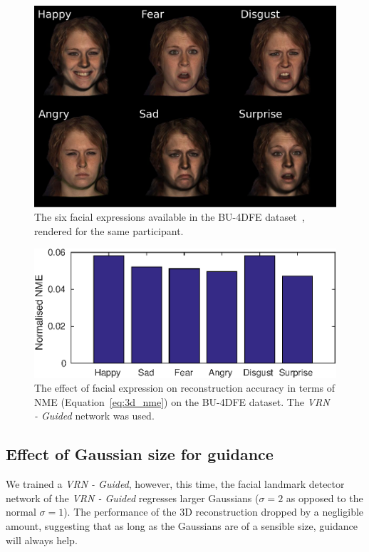 \begin{figure}
  \centering
  \includegraphics[width=0.8\linewidth]{img/bu4dfe_expressions.pdf}
  \caption[The six facial expressions available in the BU-4DFE
  dataset]{The six facial expressions available in the BU-4DFE
    dataset~\cite{yin2008high}, rendered for the same participant.}
  \label{fig:bu4dfe_expressions}
\end{figure}

\begin{figure}
  \centering
  \includegraphics[width=0.7\linewidth]{curves/ablation_expression.eps}
  \caption[Effect of facial expressions]{The effect of facial
    expression on reconstruction accuracy in terms of NME
    (Equation~\ref{eq:3d_nme}) on the BU-4DFE dataset. The \textit{VRN
      - Guided} network was used.}
  \label{fig:effect_expression}
\end{figure}

\subsection{Effect of Gaussian size for guidance} We trained a
\textit{VRN - Guided}, however, this time, the facial landmark
detector network of the \textit{VRN - Guided} regresses larger
Gaussians ($\sigma = 2$ as opposed to the normal $\sigma = 1$). The
performance of the 3D reconstruction dropped by a negligible amount,
suggesting that as long as the Gaussians are of a sensible size,
guidance will always help.

